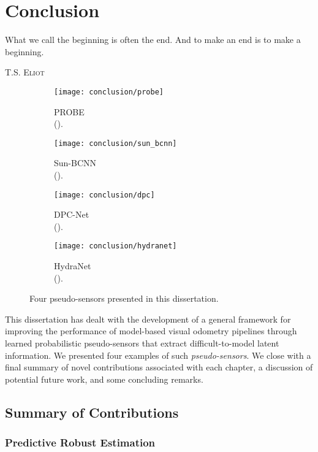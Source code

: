 \chapter{Conclusion}
\epigraph{What we call the beginning is often the end. And to make an end is to make a beginning.}{\textsc{T.S. Eliot}}
\begin{figure}
\begin{subfigure}[]{0.24\textwidth}
    \texttt{[image: conclusion/probe]}
  \caption{PROBE \\ ().}
\end{subfigure}
\begin{subfigure}[]{0.24\textwidth}
    \texttt{[image: conclusion/sun\_bcnn]}
  \caption{Sun-BCNN \\ ().}
\end{subfigure}
\begin{subfigure}[]{0.24\textwidth}
    \texttt{[image: conclusion/dpc]}
  \caption{DPC-Net \\ ().}
\end{subfigure}
\begin{subfigure}[]{0.22\textwidth}
    \texttt{[image: conclusion/hydranet]}
  \caption{HydraNet \\ ().}
\end{subfigure}
\caption{Four pseudo-sensors presented in this dissertation.}
\end{figure}

This dissertation has dealt with the development of a general framework for improving the performance of model-based visual odometry pipelines through learned probabilistic pseudo-sensors that extract difficult-to-model latent information.  We presented four examples of such \textit{pseudo-sensors}. We close with a final summary of novel contributions associated with each chapter, a discussion of potential future work, and some concluding remarks.

\section{Summary of Contributions}

\subsection{Predictive Robust Estimation}

